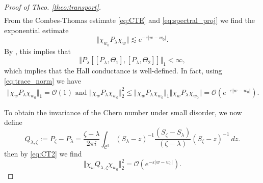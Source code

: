 \documentclass[reqno,12pt,letterpaper]{amsart}
\numberwithin{equation}{section}
\begin{document}
\begin{proof}[Proof of Theo. \ref{theo:transport}]
\begin{equation}
\begin{split}
\end{split}
\end{equation}
From the Combes-Thomas estimate \eqref{eq:CTE} and 
\eqref{eq:spectral_proj} we find the exponential estimate 
\begin{equation} 
\label{eq:exp_estm}
\Vert \chi_{w_0} P_{\lambda} \chi_{w} \Vert \lesssim   e^{-\varepsilon \vert w-w_0 \vert}.
\end{equation}
By \cite[Lemma $3.1$]{GKS}, this implies that $$\Vert P_{\lambda} [[P_{\lambda},\Theta_1],[P_{\lambda},\Theta_2]]\Vert_1<\infty,$$
which implies that the Hall conductance is well-defined.
In fact, using \eqref{eq:trace_norm} we have
\begin{equation}
\label{eq:CT2} \begin{split}
\Vert \chi_w P_{\lambda} \chi_{w_0} \Vert_1 =  \mathcal O(1) \text{ and } 
\Vert \chi_w P_{\lambda} \chi_{w_0} \Vert^2_2 \le \Vert \chi_w P_{\lambda} \chi_{w_0} \Vert_1\Vert \chi_w P_{\lambda} \chi_{w_0} \Vert = \mathcal O(e^{-\varepsilon \vert w-w_0 \vert}).
\end{split}
\end{equation}

To obtain the invariance of the Chern number under small disorder, we now define 
\begin{equation}
 Q_{\lambda,\zeta} := P_{\zeta}-P_{\lambda} = \frac{\zeta-\lambda}{2\pi i } \int_{\mathcal C^3} (S_{\lambda}-z)^{-1} \frac{(S_{\zeta}-S_{\lambda})}{(\zeta-\lambda)} (S_{\zeta}-z)^{-1} \ dz.
 \end{equation}
then by \eqref{eq:CT2} we find 
\begin{equation}
\label{eq:HS_norm}
\Vert \chi_w Q_{\lambda, \zeta} \chi_{w_0}\Vert_2^2= \mathcal O(e^{-\varepsilon \vert w-w_0 \vert}).
\end{equation}


\end{proof}
\end{document}
